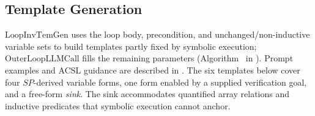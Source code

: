 \subsection{Template Generation}
\label{sec:template}

$\mathrm{LoopInvTemGen}$ uses the loop body, precondition, and unchanged/non-inductive variable sets to build templates partly fixed by symbolic execution; $\mathrm{OuterLoopLLMCall}$ fills the remaining parameters (Algorithm~ in ). Prompt examples and ACSL guidance are described in .
The six templates below cover four $\textit{SP}$-derived variable forms, one form enabled by a supplied verification goal, and a free-form \emph{sink}. The sink accommodates quantified array relations and inductive predicates that symbolic execution cannot anchor.

